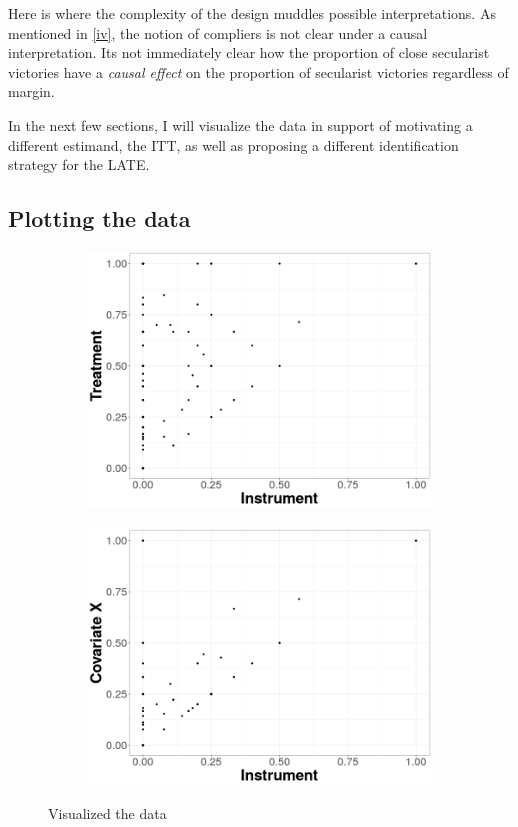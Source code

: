 \documentclass{scrartcl}
\begin{document}
Here is where the complexity of the design muddles possible interpretations. As mentioned in \ref{iv}, the notion of compliers is not clear under a causal interpretation. Its not immediately clear how the proportion of close secularist victories have a \textit{causal effect} on the proportion of secularist victories regardless of margin. 

In the next few sections, I will visualize the data in support of motivating a different estimand, the ITT, as well as proposing a different identification strategy for the LATE.

\subsection{Plotting the data}

\begin{figure}[h!]
  \begin{subfigure}{.5\textwidth}
    \centering
    \includegraphics[width=.95\linewidth]{replication/output/D_on_Z.png}
    \label{fig:sfig1}
  \end{subfigure}%
  \begin{subfigure}{.5\textwidth}
    \centering
    \includegraphics[width=.95\linewidth]{replication/output/X_on_Z.png}
    \label{fig:sfig2}
  \end{subfigure}
  \caption{Visualized the data}
  \label{fig:the_data}
\end{figure}
\end{document}
